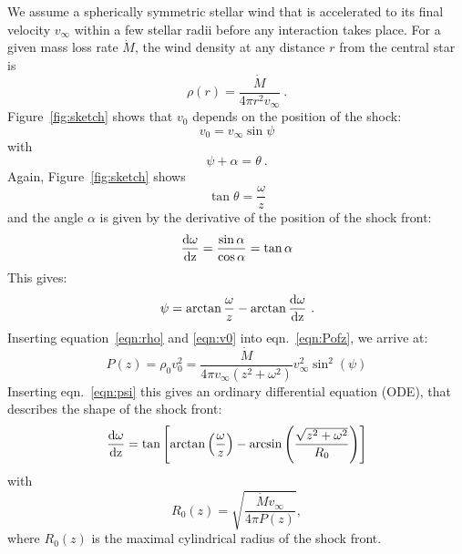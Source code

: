 \documentclass[manuscript]{aastex}
\begin{document}
We assume a spherically symmetric stellar wind that is accelerated to its final velocity $v_{\infty}$ within a few stellar radii before any interaction takes place. For a given mass loss rate $\dot M$, the wind density at any distance $r$ from the central star is 
\begin{equation}\label{eqn:rho}
\rho(r) = \frac{\dot M}{4 \pi r^2 v_{\infty}}\ .
\end{equation}
Figure~\ref{fig:sketch} shows that $v_0$ depends on the position of the shock:
\begin{equation}
\label{eqn:v0}v_0 = v_{\infty} \sin \psi
\end{equation}
with 
\begin{equation}\label{eqn:angle}
\psi+\alpha =  \theta \ .
\end{equation}
Again, Figure~\ref{fig:sketch} shows
\begin{equation}\label{eqn:theta}
\tan\theta = \frac{\omega}{z}
\end{equation}
and the angle $\alpha$ is given by the derivative of the position of the shock front:
\begin{equation}\label{eqn:deriv}
\frac{\rm{d}\omega}{\rm{d}z} = \frac{\sin \alpha}{\cos \alpha} = \tan{\alpha}
\end{equation}
This gives:
\begin{equation}\label{eqn:psi}
\psi = \arctan{\frac{\omega}{z}} - \arctan{\frac{\rm{d}\omega}{\rm{d}z}}\ .
\end{equation}
Inserting equation~\ref{eqn:rho} and \ref{eqn:v0} into eqn.~\ref{eqn:Pofz}, we arrive at: 
\begin{equation}\label{eqn:P}
P(z) = \rho_0 v_0^2 = \frac{\dot{M}}{4\pi v_{\infty}(z^2+\omega^2)} v_{\infty}^2 \sin^2(\psi)
\end{equation}
Inserting eqn.~\ref{eqn:psi} this gives an ordinary differential equation (ODE), that describes the shape of the shock front:
\begin{equation}\label{eqn:ode}
\frac{\rm{d}\omega}{\rm{d}z} = \tan\left[\arctan\left(\frac{\omega}{z}\right)-\arcsin\left(\frac{\sqrt{z^2+\omega^2}}{R_0}\right)\right]
\end{equation}
with
\begin{equation}\label{eqn:r0}
R_0(z) = \sqrt{\frac{\dot{M} v_{\infty}}{4\pi P(z)}},
\end{equation}
where $R_0(z)$ is the maximal cylindrical radius of the shock front.
\end{document}
